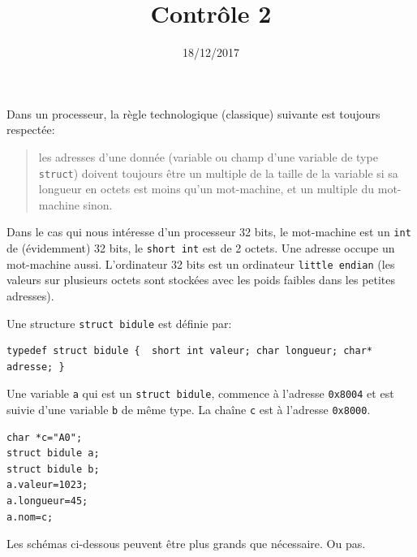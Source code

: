 \documentclass[a4paper]{iutvexam}
\title{Contrôle 2}
\date{18/12/2017}
\begin{document}
\begin{questions}

  Dans un processeur, la règle technologique (classique) suivante est
  toujours respectée:
  \begin{quote}
    les adresses d'une donnée (variable ou champ d'une variable de type
    \texttt{struct}) doivent toujours être un multiple de la taille de
    la variable si sa longueur en octets est moins qu'un mot-machine, et
    un multiple du mot-machine sinon.
  \end{quote}

  Dans le cas qui nous intéresse d'un processeur 32 bits, le mot-machine
  est un \texttt{int} de (évidemment) 32 bits, le \texttt{short int} est
  de 2 octets. Une adresse occupe un mot-machine aussi. L'ordinateur 32
  bits est un ordinateur \texttt{little endian} (les valeurs sur
  plusieurs octets sont stockées avec les poids faibles dans les petites
  adresses).

  Une structure \texttt{struct bidule} est définie par:

\begin{verbatim}
typedef struct bidule {  short int valeur; char longueur; char* adresse; }
\end{verbatim}

  Une variable \texttt{a} qui est un \texttt{struct bidule}, commence à l'adresse \texttt{0x8004} et est suivie d'une variable \texttt{b} de même type. La chaîne \texttt{c} est à l'adresse \texttt{0x8000}.

\begin{verbatim}
char *c="A0";
struct bidule a;
struct bidule b;
a.valeur=1023;
a.longueur=45;
a.nom=c;
\end{verbatim}

  Les schémas ci-dessous peuvent être plus grands que nécessaire. Ou pas.

\end{questions}
\end{document}
